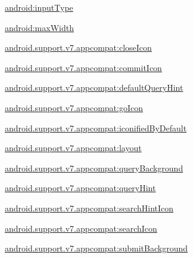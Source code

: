 {\ttfamily \hyperlink{classandroid_1_1support_1_1v7_1_1appcompat_1_1R_1_1styleable_a961ee19122e31cefa5edcf20e27837e0}{android\+:input\+Type}}

{\ttfamily \hyperlink{classandroid_1_1support_1_1v7_1_1appcompat_1_1R_1_1styleable_a734d834efc9a3afe64b8db664732ff12}{android\+:max\+Width}}

{\ttfamily \hyperlink{classandroid_1_1support_1_1v7_1_1appcompat_1_1R_1_1styleable_a7325792da95c39bc84bbe457b170676d}{android.\+support.\+v7.\+appcompat\+:close\+Icon}}

{\ttfamily \hyperlink{classandroid_1_1support_1_1v7_1_1appcompat_1_1R_1_1styleable_afb59632753076895715c52a281d2ee4e}{android.\+support.\+v7.\+appcompat\+:commit\+Icon}}

{\ttfamily \hyperlink{classandroid_1_1support_1_1v7_1_1appcompat_1_1R_1_1styleable_ae4b4d1c44649fd0230d2b11b181d19bd}{android.\+support.\+v7.\+appcompat\+:default\+Query\+Hint}}

{\ttfamily \hyperlink{classandroid_1_1support_1_1v7_1_1appcompat_1_1R_1_1styleable_afd493beb8db4436433dc905ac38231a1}{android.\+support.\+v7.\+appcompat\+:go\+Icon}}

{\ttfamily \hyperlink{classandroid_1_1support_1_1v7_1_1appcompat_1_1R_1_1styleable_a4dd3091dfa10ff0d05004332a0fbb677}{android.\+support.\+v7.\+appcompat\+:iconified\+By\+Default}}

{\ttfamily \hyperlink{classandroid_1_1support_1_1v7_1_1appcompat_1_1R_1_1styleable_ad241a6c289e7efe81bf10167a3969b9a}{android.\+support.\+v7.\+appcompat\+:layout}}

{\ttfamily \hyperlink{classandroid_1_1support_1_1v7_1_1appcompat_1_1R_1_1styleable_a4bfbfa40648f5bbab65bd2ad5dc0bd4d}{android.\+support.\+v7.\+appcompat\+:query\+Background}}

{\ttfamily \hyperlink{classandroid_1_1support_1_1v7_1_1appcompat_1_1R_1_1styleable_a90f513ff603af9e55eadeff9c70fbbfb}{android.\+support.\+v7.\+appcompat\+:query\+Hint}}

{\ttfamily \hyperlink{classandroid_1_1support_1_1v7_1_1appcompat_1_1R_1_1styleable_a2794d77a4ddac9ee228c28d219ff6b31}{android.\+support.\+v7.\+appcompat\+:search\+Hint\+Icon}}

{\ttfamily \hyperlink{classandroid_1_1support_1_1v7_1_1appcompat_1_1R_1_1styleable_a8e6e122f919effcc0243ea3cc6d47524}{android.\+support.\+v7.\+appcompat\+:search\+Icon}}

{\ttfamily \hyperlink{classandroid_1_1support_1_1v7_1_1appcompat_1_1R_1_1styleable_a7d61d4e0aeb32c5c70b0aabb85cf4eb6}{android.\+support.\+v7.\+appcompat\+:submit\+Background}}

